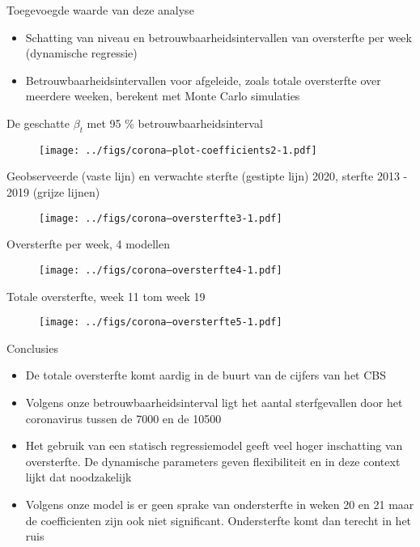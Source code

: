 \documentclass[final, 12pt, aspectratio=169, xcolor={dvipsnames}]{beamer}
\begin{document}
\begin{frame}{Toegevoegde waarde van deze analyse}
  \begin{itemize}
    \item Schatting van niveau en betrouwbaarheidsintervallen van oversterfte per week (dynamische regressie)
    \item Betrouwbaarheidsintervallen voor afgeleide, zoals totale oversterfte over meerdere weeken, berekent met Monte Carlo simulaties 
    \end{itemize}
\end{frame}

\begin{frame}{De geschatte $\beta_{t}$ met 95 \% betrouwbaarheidsinterval}
  \begin{figure}
    \texttt{[image: ../figs/corona--plot-coefficients2-1.pdf]}
  \end{figure}
\end{frame}

\begin{frame}{Geobserveerde (vaste lijn) en verwachte sterfte (gestipte lijn) 2020, sterfte 2013 - 2019 (grijze lijnen) }
\begin{figure}
\centering
\texttt{[image: ../figs/corona--oversterfte3-1.pdf]}
\end{figure}
\end{frame}

\begin{frame}{Oversterfte per week, 4 modellen}
\begin{figure}
\centering
\texttt{[image: ../figs/corona--oversterfte4-1.pdf]}
\end{figure}
\end{frame}

\begin{frame}{Totale oversterfte, week 11 tom week 19}
\begin{figure}
\centering
\texttt{[image: ../figs/corona--oversterfte5-1.pdf]}
\end{figure}
\end{frame}

\begin{frame}{Conclusies}
    \begin{itemize}
    \item De totale oversterfte komt aardig in de buurt van de cijfers van het CBS
    \item Volgens onze betrouwbaarheidsinterval ligt het aantal sterfgevallen door het coronavirus tussen de 7000 en de 10500
      \item Het gebruik van een statisch regressiemodel geeft veel hoger inschatting van oversterfte. De dynamische parameters geven flexibiliteit en in deze context lijkt dat noodzakelijk
      \item Volgens onze model is er geen sprake van ondersterfte in weken 20 en 21 maar de coefficienten zijn ook niet significant. Ondersterfte komt dan terecht in het ruis
    \end{itemize}
  \end{frame}
\end{document}
